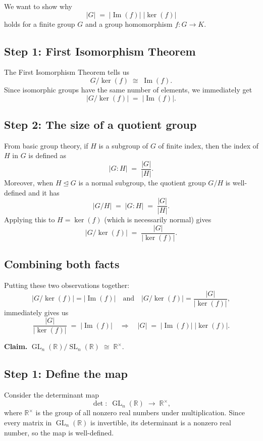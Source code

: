 \documentclass[12pt]{article}
\title{}
\author{Jerich Lee}
\date{\today}
\theoremstyle{definition} %
\theoremstyle{plain} %
\begin{document}
\maketitle
We want to show why
\[
\lvert G\rvert \;=\; \lvert \operatorname{Im}(f)\rvert\;\lvert \ker(f)\rvert
\]
holds for a finite group $G$ and a group homomorphism $f: G \to K$.

\subsection*{Step 1: First Isomorphism Theorem}
The First Isomorphism Theorem tells us
\[
G \big/ \ker(f) \;\cong\; \operatorname{Im}(f).
\]
Since isomorphic groups have the same number of elements, we immediately get
\[
\lvert G/\ker(f)\rvert \;=\; \lvert \operatorname{Im}(f)\rvert.
\]

\subsection*{Step 2: The size of a quotient group}
From basic group theory, if $H$ is a subgroup of $G$ of finite index, then the index of $H$ in $G$ is defined as
\[
\lvert G : H\rvert \;=\; \frac{\lvert G\rvert}{\lvert H\rvert}.
\]
Moreover, when $H \trianglelefteq G$ is a normal subgroup, the quotient group $G/H$ is well-defined and it has
\[
\lvert G/H\rvert \;=\; \lvert G : H\rvert \;=\; \frac{\lvert G\rvert}{\lvert H\rvert}.
\]
Applying this to $H = \ker(f)$ (which is necessarily normal) gives
\[
\lvert G/\ker(f)\rvert \;=\; \frac{\lvert G\rvert}{\lvert \ker(f)\rvert}.
\]

\subsection*{Combining both facts}
Putting these two observations together:
\[
\lvert G/\ker(f)\rvert
= \lvert \operatorname{Im}(f)\rvert
\quad\text{and}\quad
\lvert G/\ker(f)\rvert 
= \frac{\lvert G\rvert}{\lvert \ker(f)\rvert},
\]
immediately gives us
\[
\frac{\lvert G\rvert}{\lvert \ker(f)\rvert}
\;=\;
\lvert \operatorname{Im}(f)\rvert
\quad\Longrightarrow\quad
\lvert G\rvert 
\;=\; 
\lvert \operatorname{Im}(f)\rvert 
\;\lvert \ker(f)\rvert.
\]

\noindent
\textbf{Claim.} $\operatorname{GL}_n(\mathbb{R}) \big/ \operatorname{SL}_n(\mathbb{R}) \;\cong\; \mathbb{R}^{\times}.$

\subsection*{Step 1: Define the map}
Consider the determinant map
\[
\det:\; \operatorname{GL}_n(\mathbb{R})\;\longrightarrow\;\mathbb{R}^\times,
\]
where $\mathbb{R}^\times$ is the group of all nonzero real numbers under multiplication. Since every matrix in $\operatorname{GL}_n(\mathbb{R})$ is invertible, its determinant is a nonzero real number, so the map is well-defined.
\end{document}
